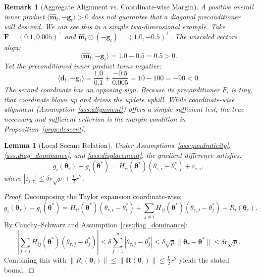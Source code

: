 \documentclass[11pt,a4paper]{article}
\newtheorem{lemma}{Lemma}
\newtheorem{remark}{Remark}
\begin{document}
\begin{remark}[Aggregate Alignment vs. Coordinate-wise Margin]
A positive overall inner product $\langle \hat{\mathbf{m}}_t, -\mathbf{g}_t \rangle > 0$ does not guarantee that a diagonal preconditioner will descend. We can see this in a simple two-dimensional example. Take $\mathbf{F} = (0.1, 0.005)^\top$ and $\hat{\mathbf{m}}_t \odot (-\mathbf{g}_t) = (1.0, -0.5)^\top$. The unscaled vectors align:
\[
\langle \hat{\mathbf{m}}_t, -\mathbf{g}_t \rangle = 1.0 - 0.5 = 0.5 > 0.
\]
Yet the preconditioned inner product turns negative:
\[
\langle \mathbf{d}_t, -\mathbf{g}_t \rangle = \frac{1.0}{0.1} + \frac{-0.5}{0.005} = 10 - 100 = -90 < 0.
\]
The second coordinate has an opposing sign. Because its preconditioner $F_i$ is tiny, that coordinate blows up and drives the update uphill. While coordinate-wise alignment (Assumption~\ref{ass:alignment}) offers a simple sufficient test, the true necessary and sufficient criterion is the margin condition in Proposition~\ref{prop:descent}.
\end{remark}

\begin{lemma}[Local Secant Relation]
\label{lem:secant}
Under Assumptions~\ref{ass:quadraticity}, \ref{ass:diag_dominance}, and \ref{ass:displacement}, the gradient difference satisfies:
\begin{equation}
g_i(\boldsymbol{\theta}_\tau) - g_i(\boldsymbol{\theta}^*) = H_{ii}(\boldsymbol{\theta}^*)(\theta_{\tau,i} - \theta_i^*) + \varepsilon_{i,\tau},
\end{equation}
where $|\varepsilon_{i,\tau}| \le \delta r \sqrt{p} + \frac{L}{2} r^2$.
\end{lemma}

\begin{proof}
Decomposing the Taylor expansion coordinate-wise:
\begin{equation}
g_i(\boldsymbol{\theta}_\tau) - g_i(\boldsymbol{\theta}^*) = H_{ii}(\boldsymbol{\theta}^*)(\theta_{\tau,i} - \theta_i^*) + \sum_{j \ne i} H_{ij}(\boldsymbol{\theta}^*)(\theta_{\tau,j} - \theta_j^*) + R_i(\boldsymbol{\theta}_\tau).
\end{equation}
By Cauchy--Schwarz and Assumption~\ref{ass:diag_dominance}:
\begin{equation}
\left| \sum_{j \ne i} H_{ij}(\boldsymbol{\theta}^*)(\theta_{\tau,j} - \theta_j^*) \right| \le \delta \sum_{j=1}^p |\theta_{\tau,j} - \theta_j^*| \le \delta \sqrt{p} \|\boldsymbol{\theta}_\tau - \boldsymbol{\theta}^*\| \le \delta r \sqrt{p}.
\end{equation}
Combining this with $\|R_i(\boldsymbol{\theta}_\tau)\| \le \|\mathbf{R}(\boldsymbol{\theta}_\tau)\| \le \frac{L}{2} r^2$ yields the stated bound.
\end{proof}
\end{document}
